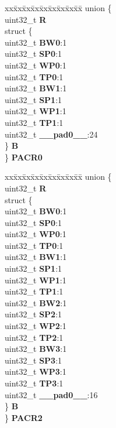 \begin{DoxyCompactItemize}
\begin{tabbing}
\end{tabbing}\item 
\mbox{\label{structPBRIDGE__B__tag_a70004f3dc8a6c90e1a90240987ea5ca0}} 
\begin{tabbing}
xx\=xx\=xx\=xx\=xx\=xx\=xx\=xx\=xx\=\kill
union \{\\
\>uint32\_t {\bfseries R}\\
\>struct \{\\
\>\>uint32\_t {\bfseries BW0}:1\\
\>\>uint32\_t {\bfseries SP0}:1\\
\>\>uint32\_t {\bfseries WP0}:1\\
\>\>uint32\_t {\bfseries TP0}:1\\
\>\>uint32\_t {\bfseries BW1}:1\\
\>\>uint32\_t {\bfseries SP1}:1\\
\>\>uint32\_t {\bfseries WP1}:1\\
\>\>uint32\_t {\bfseries TP1}:1\\
\>\>uint32\_t {\bfseries \_\_pad0\_\_}:24\\
\>\} {\bfseries B}\\
\} {\bfseries PACR0}\\

\end{tabbing}\item 
\mbox{\label{structPBRIDGE__B__tag_a6e4f3567de49e662c348685267f83646}} 
\begin{tabbing}
xx\=xx\=xx\=xx\=xx\=xx\=xx\=xx\=xx\=\kill
union \{\\
\>uint32\_t {\bfseries R}\\
\>struct \{\\
\>\>uint32\_t {\bfseries BW0}:1\\
\>\>uint32\_t {\bfseries SP0}:1\\
\>\>uint32\_t {\bfseries WP0}:1\\
\>\>uint32\_t {\bfseries TP0}:1\\
\>\>uint32\_t {\bfseries BW1}:1\\
\>\>uint32\_t {\bfseries SP1}:1\\
\>\>uint32\_t {\bfseries WP1}:1\\
\>\>uint32\_t {\bfseries TP1}:1\\
\>\>uint32\_t {\bfseries BW2}:1\\
\>\>uint32\_t {\bfseries SP2}:1\\
\>\>uint32\_t {\bfseries WP2}:1\\
\>\>uint32\_t {\bfseries TP2}:1\\
\>\>uint32\_t {\bfseries BW3}:1\\
\>\>uint32\_t {\bfseries SP3}:1\\
\>\>uint32\_t {\bfseries WP3}:1\\
\>\>uint32\_t {\bfseries TP3}:1\\
\>\>uint32\_t {\bfseries \_\_pad0\_\_}:16\\
\>\} {\bfseries B}\\
\} {\bfseries PACR2}\\


\end{tabbing}
\end{DoxyCompactItemize}
